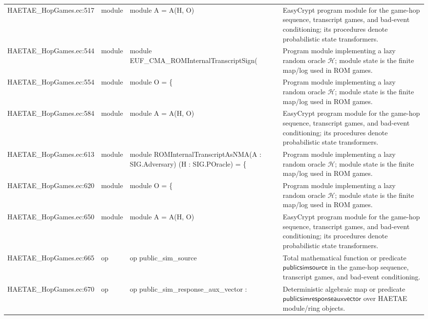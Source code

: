 \documentclass[10pt]{article}
\begin{document}
\begin{longtable}{L{0.11\textwidth}L{0.055\textwidth}L{0.385\textwidth}L{0.41\textwidth}}
HAETAE\_\allowbreak{}HopGames.\allowbreak{}ec:\allowbreak{}517 & module & {\ttfamily\scriptsize module A = A(H, O)} & EasyCrypt program module for the game-hop sequence, transcript games, and bad-event conditioning; its procedures denote probabilistic state transformers. \\
HAETAE\_\allowbreak{}HopGames.\allowbreak{}ec:\allowbreak{}544 & module & {\ttfamily\scriptsize module EUF\_\allowbreak{}CMA\_\allowbreak{}ROMInternalTranscriptSign(} & Program module implementing a lazy random oracle $\mathcal H$; module state is the finite map/log used in ROM games. \\
HAETAE\_\allowbreak{}HopGames.\allowbreak{}ec:\allowbreak{}554 & module & {\ttfamily\scriptsize module O = \{} & Program module implementing a lazy random oracle $\mathcal H$; module state is the finite map/log used in ROM games. \\
HAETAE\_\allowbreak{}HopGames.\allowbreak{}ec:\allowbreak{}584 & module & {\ttfamily\scriptsize module A = A(H, O)} & EasyCrypt program module for the game-hop sequence, transcript games, and bad-event conditioning; its procedures denote probabilistic state transformers. \\
HAETAE\_\allowbreak{}HopGames.\allowbreak{}ec:\allowbreak{}613 & module & {\ttfamily\scriptsize module ROMInternalTranscriptAsNMA(A : SIG.Adversary) (H : SIG.POracle) = \{} & Program module implementing a lazy random oracle $\mathcal H$; module state is the finite map/log used in ROM games. \\
HAETAE\_\allowbreak{}HopGames.\allowbreak{}ec:\allowbreak{}620 & module & {\ttfamily\scriptsize module O = \{} & Program module implementing a lazy random oracle $\mathcal H$; module state is the finite map/log used in ROM games. \\
HAETAE\_\allowbreak{}HopGames.\allowbreak{}ec:\allowbreak{}650 & module & {\ttfamily\scriptsize module A = A(H, O)} & EasyCrypt program module for the game-hop sequence, transcript games, and bad-event conditioning; its procedures denote probabilistic state transformers. \\
HAETAE\_\allowbreak{}HopGames.\allowbreak{}ec:\allowbreak{}665 & op & {\ttfamily\scriptsize op public\_\allowbreak{}sim\_\allowbreak{}source} & Total mathematical function or predicate $\mathsf{publicsimsource}$ in the game-hop sequence, transcript games, and bad-event conditioning. \\
HAETAE\_\allowbreak{}HopGames.\allowbreak{}ec:\allowbreak{}670 & op & {\ttfamily\scriptsize op public\_\allowbreak{}sim\_\allowbreak{}response\_\allowbreak{}aux\_\allowbreak{}vector :} & Deterministic algebraic map or predicate $\mathsf{publicsimresponseauxvector}$ over HAETAE module/ring objects. \\

\end{longtable}
\end{document}
